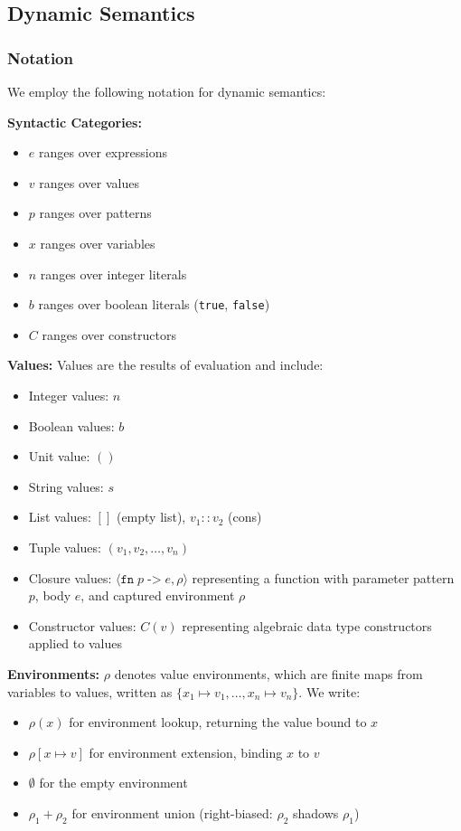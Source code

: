\documentclass[conference,onecolumn]{IEEEtran}
\begin{document}
\subsection{Dynamic Semantics}

\subsubsection{Notation}

We employ the following notation for dynamic semantics:

\textbf{Syntactic Categories:}
\begin{itemize}
\item $e$ ranges over expressions
\item $v$ ranges over values
\item $p$ ranges over patterns
\item $x$ ranges over variables
\item $n$ ranges over integer literals
\item $b$ ranges over boolean literals (\texttt{true}, \texttt{false})
\item $C$ ranges over constructors
\end{itemize}

\textbf{Values:}
Values are the results of evaluation and include:
\begin{itemize}
\item Integer values: $n$
\item Boolean values: $b$
\item Unit value: $()$
\item String values: $s$
\item List values: $[]$ (empty list), $v_1 :: v_2$ (cons)
\item Tuple values: $(v_1, v_2, \ldots, v_n)$
\item Closure values: $\langle \texttt{fn} \; p \; \texttt{->} \; e, \rho \rangle$ representing a function with parameter pattern $p$, body $e$, and captured environment $\rho$
\item Constructor values: $C(v)$ representing algebraic data type constructors applied to values
\end{itemize}

\textbf{Environments:}
$\rho$ denotes value environments, which are finite maps from variables to values, written as $\{x_1 \mapsto v_1, \ldots, x_n \mapsto v_n\}$. We write:
\begin{itemize}
\item $\rho(x)$ for environment lookup, returning the value bound to $x$
\item $\rho[x \mapsto v]$ for environment extension, binding $x$ to $v$
\item $\emptyset$ for the empty environment
\item $\rho_1 + \rho_2$ for environment union (right-biased: $\rho_2$ shadows $\rho_1$)
\end{itemize}
\end{document}
